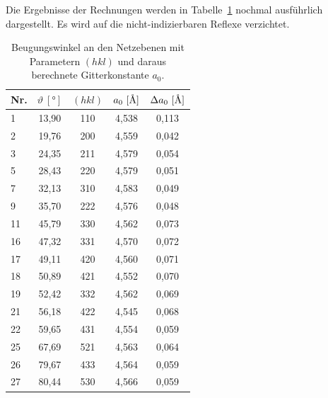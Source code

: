 \documentclass[a4paper,twoside,final]{article}
\begin{document}
Die Ergebnisse der Rechnungen werden in Tabelle~\ref{tab:Ergebnisse} nochmal ausführlich dargestellt. Es wird auf die nicht-indizierbaren Reflexe verzichtet.
\begin{table}[ht]
	\centering
	\caption{Beugungswinkel an den Netzebenen mit Parametern $(hkl)$ und daraus berechnete Gitterkonstante $a_0$.}
	\label{tab:Ergebnisse}
	\begin{tabular}{l c c c c}
		\toprule
      Nr. & $\vartheta~[\si{\degree}]$ & $(hkl)$ & $a_0~[\si{\textup{\AA}}]$ & $\Delta a_0~[\si{\textup{\AA}}]$\\
    \midrule
    1  & 13,90 & 110 & 4,538 & 0,113 \\
    2  & 19,76 & 200 & 4,559 & 0,042 \\
    3  & 24,35 & 211 & 4,579 & 0,054 \\
    5  & 28,43 & 220 & 4,579 & 0,051 \\
    7  & 32,13 & 310 & 4,583 & 0,049 \\
    9  & 35,70 & 222 & 4,576 & 0,048 \\
    11 & 45,79 & 330 & 4,562 & 0,073 \\
    16 & 47,32 & 331 & 4,570 & 0,072 \\
    17 & 49,11 & 420 & 4,560 & 0,071 \\
    18 & 50,89 & 421 & 4,552 & 0,070 \\
    19 & 52,42 & 332 & 4,562 & 0,069 \\
    21 & 56,18 & 422 & 4,545 & 0,068 \\
    22 & 59,65 & 431 & 4,554 & 0,059 \\
    25 & 67,69 & 521 & 4,563 & 0,064 \\
    26 & 79,67 & 433 & 4,564 & 0,059 \\
    27 & 80,44 & 530 & 4,566 & 0,059
	\end{tabular}
\end{table}
\end{document}

